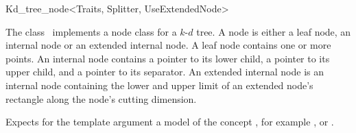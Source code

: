 

\begin{ccRefClass}{Kd_tree_node<Traits, Splitter, UseExtendedNode>}  %


\begin{ccAdvanced}

\ccDefinition
  
The class \ccRefName\ implements a node class for a $k$-$d$ tree. 
A node is either a leaf node, an internal node or an extended internal node.
A leaf node contains one or more points. An internal node contains a pointer
to its lower child, a pointer to its upper child, and a pointer to its separator.
An extended internal node is an internal node containing the lower and 
upper limit of an extended node's rectangle
along the node's cutting dimension.



Expects for the template argument a model of the concept ,
for example , or .

\ccTypes




\ccCreation
{}  %




\end{ccAdvanced}
\end{ccRefClass}
